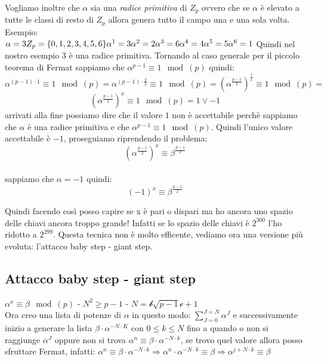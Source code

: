 \documentclass[10pt,a4paper]{article}
\begin{document}
Vogliamo inoltre che $\alpha$ sia una \textit{radice primitiva} di $Z_p$ ovvero che se $\alpha$ è elevato a tutte le classi di resto di $Z_p$ allora genera tutto il campo una e una sola volta.\\
Esempio:\\
$
\alpha = 3
\\Z_p=\{0,1,2,3,4,5,6\}\\
\alpha^1 = 3\\
\alpha^2 = 2\\
\alpha^3 = 6\\
\alpha^4 = 4\\
\alpha^5 = 5\\
\alpha^6 = 1\\
$
Quindi nel nostro esempio 3 è una radice primitiva. Tornando al caso generale per il piccolo teorema di Fermat sappiamo che $\alpha^{p-1}\equiv 1 \mod(p)$ quindi:
$$ \alpha^{(p-1)\cdot 1}\equiv 1 \mod(p) =\alpha^{(p-1)\cdot \frac{2}{2}}\equiv 1 \mod(p) = (\alpha^{\frac{p-1}{2}})^\frac{1}{2}\equiv 1 \mod(p) =$$ $$ (\alpha^{\frac{p-1}{2}})^x\equiv 1 \mod(p) = 1 \vee -1 $$
arrivati alla fine possiamo dire che il valore $1$ non è accettabile perchè sappiamo che $\alpha$ è una radice primitiva e che $\alpha^{p-1}\equiv 1 \mod(p)$. Quindi l'unico valore accettabile è $-1$, proseguiamo riprendendo il problema:\\
$$ (\alpha^{\frac{p-1}{2}})^x\equiv \beta^{\frac{p-1}{2}} $$\\

sappiamo che $\alpha = -1$ quindi:\\

$$(-1)^x \equiv \beta^{\frac{p-1}{2}}$$

Quindi facendo così posso capire se x è pari o dispari ma ho ancora uno spazio delle chiavi ancora troppo grande! Infatti se lo spazio delle chiavi è $2^{300}$ l'ho ridotto a $2^{299}$. Questa tecnica non è molto efficente, vediamo ora una versione più evoluta: l'attacco baby step - giant step.

\subsection{Attacco baby step - giant step}

$\alpha^x \equiv \beta \mod(p)$ - $N^2\ge p-1 $ - $N=\mathcal{b} \sqrt{p-1} \mathcal{c} +1$\\

Ora creo una lista di potenze di $\alpha$ in questo modo: $\sum_{J=0}^{J=N} \alpha^J$ e successivamente inizio a generare la lista $\beta \cdot \alpha^{-N\cdot K}$ con $0 \leq k \leq N$ fino a quando o non si raggiunge $\alpha^J$ oppure non si trova $\alpha^n \equiv \beta \cdot\alpha^{-N\cdot k}$, se trovo quel valore allora posso sfruttare Fermat, infatti:
$\alpha^n \equiv \beta \cdot\alpha^{-N\cdot k} \Rightarrow \alpha^n \cdot \alpha^{-N\cdot k} \equiv \beta \Rightarrow \alpha^{j+N\cdot k} \equiv \beta $\\
\end{document}
